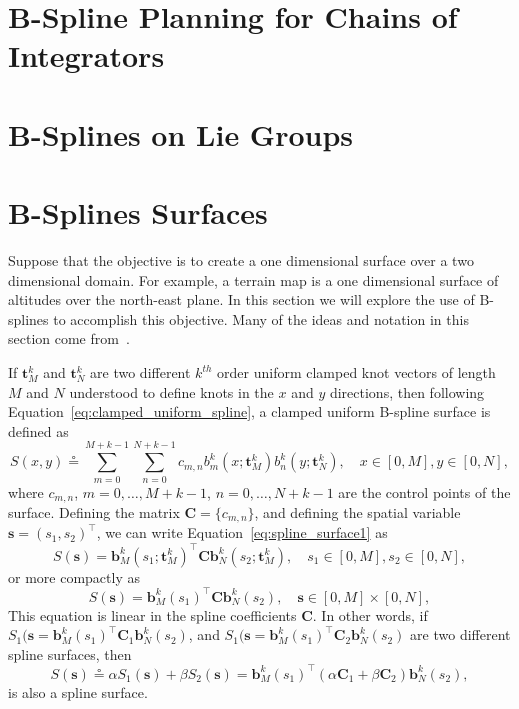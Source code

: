 \documentclass{article}
\newcommand{\defeq}{\circeq}
\newcommand{\bbf}{\mathbf{b}}
\newcommand{\sbf}{\mathbf{s}}
\newcommand{\Cbf}{\mathbf{C}}
\begin{document}
\section{B-Spline Planning for Chains of Integrators}

\section{B-Splines on Lie Groups}

\section{B-Splines Surfaces}

Suppose that the objective is to create a one dimensional surface over a two dimensional domain.  For example, a terrain map is a one dimensional surface of altitudes over the north-east plane.  In this section we will explore the use of B-splines to accomplish this objective. Many of the ideas and notation in this section come from~\cite{RodriguesTsiogkasAguiar20}.

If $\mathbf{t}_M^k$ and $\mathbf{t}_N^k$ are two different $k^{th}$ order uniform clamped knot vectors of length $M$ and $N$ understood to define knots in the $x$ and $y$ directions, then following Equation~\eqref{eq:clamped_uniform_spline}, a clamped uniform B-spline surface is defined as 
\begin{equation}\label{eq:spline_surface1}
S(x, y) \defeq \sum_{m=0}^{M+k-1} \sum_{n=0}^{N+k-1} c_{m,n} b^k_m(x; \mathbf{t}_M^k) b^k_n(y; \mathbf{t}_N^k), \quad x\in[0,M], y\in[0, N],
\end{equation}
where $c_{m, n}$, $m=0, \dots, M+k-1$, $n=0, \dots, N+k-1$ are the control points of the surface.  Defining the matrix $\Cbf=\{c_{m,n}\}$, and defining the spatial variable $\sbf = (s_1, s_2)^\top$, we can write Equation~\eqref{eq:spline_surface1} as
\[
S(\sbf) = \bbf^k_M(s_1; \mathbf{t}^k_M)^\top \Cbf \bbf^k_N(s_2; \mathbf{t}^k_M), \quad s_1\in[0,M], s_2\in[0, N],
\]
or more compactly as 
\begin{equation}\label{eq:spline_surface2}
S(\sbf) = \bbf^k_M(s_1)^\top \Cbf \bbf^k_N(s_2), \quad \sbf\in[0, M]\times[0, N],
\end{equation}
This equation is linear in the spline coefficients $\Cbf$.  In other words, if $S_1(\sbf=\bbf^k_M(s_1)^\top \Cbf_1 \bbf^k_N(s_2)$, and $S_1(\sbf=\bbf^k_M(s_1)^\top \Cbf_2 \bbf^k_N(s_2)$ are two different spline surfaces, then 
\[
S(\sbf)\defeq \alpha S_1(\sbf) + \beta S_2(\sbf) = \bbf^k_M(s_1)^\top \left(\alpha\Cbf_1 + \beta\Cbf_2\right) \bbf^k_N(s_2),
\]
is also a spline surface.
\end{document}
